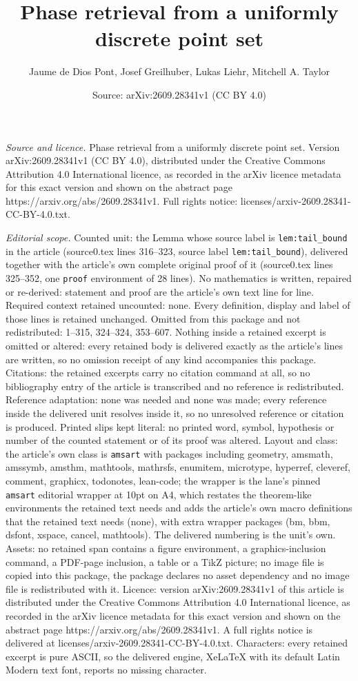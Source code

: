 \documentclass[10pt,a4paper]{amsart}
\title[Phase retrieval from a uniformly discrete point set]{Phase retrieval from a uniformly discrete point set}
\author{Jaume de Dios Pont, Josef Greilhuber, Lukas Liehr, Mitchell A. Taylor}
\date{Source: arXiv:2609.28341v1 (CC BY 4.0)}
\begin{document}
\maketitle

\noindent\emph{Source and licence.} Phase retrieval from a uniformly discrete point set. Version arXiv:2609.28341v1 (CC BY 4.0), distributed under the Creative Commons Attribution 4.0 International licence, as recorded in the arXiv licence metadata for this exact version and shown on the abstract page https://arxiv.org/abs/2609.28341v1. Full rights notice: licenses/arxiv-2609.28341-CC-BY-4.0.txt.\par\smallskip

\noindent\textit{Editorial scope.} Counted unit: the Lemma whose source label is \texttt{lem:tail\_bound} in the article (source0.tex lines 316--323, source label \texttt{lem:tail\_bound}), delivered together with the article's own complete original proof of it (source0.tex lines 325--352, one \texttt{proof} environment of 28 lines). No mathematics is written, repaired or re-derived: statement and proof are the article's own text line for line. Required context retained uncounted: none. Every definition, display and label of those lines is retained unchanged. Omitted from this package and not redistributed: 1--315, 324--324, 353--607. Nothing inside a retained excerpt is omitted or altered: every retained body is delivered exactly as the article's lines are written, so no omission receipt of any kind accompanies this package. Citations: the retained excerpts carry no citation command at all, so no bibliography entry of the article is transcribed and no reference is redistributed. Reference adaptation: none was needed and none was made; every reference inside the delivered unit resolves inside it, so no unresolved reference or citation is produced. Printed slips kept literal: no printed word, symbol, hypothesis or number of the counted statement or of its proof was altered. Layout and class: the article's own class is \texttt{amsart} with packages including geometry, amsmath, amssymb, amsthm, mathtools, mathrsfs, enumitem, microtype, hyperref, cleveref, comment, graphicx, todonotes, lean-code; the wrapper is the lane's pinned \texttt{amsart} editorial wrapper at 10pt on A4, which restates the theorem-like environments the retained text needs and adds the article's own macro definitions that the retained text needs (none), with extra wrapper packages (bm, bbm, dsfont, xspace, cancel, mathtools). The delivered numbering is the unit's own. Assets: no retained span contains a figure environment, a graphics-inclusion command, a PDF-page inclusion, a table or a TikZ picture; no image file is copied into this package, the package declares no asset dependency and no image file is redistributed with it. Licence: version arXiv:2609.28341v1 of this article is distributed under the Creative Commons Attribution 4.0 International licence, as recorded in the arXiv licence metadata for this exact version and shown on the abstract page https://arxiv.org/abs/2609.28341v1. A full rights notice is delivered at licenses/arxiv-2609.28341-CC-BY-4.0.txt. Characters: every retained excerpt is pure ASCII, so the delivered engine, XeLaTeX with its default Latin Modern text font, reports no missing character.
\end{document}
